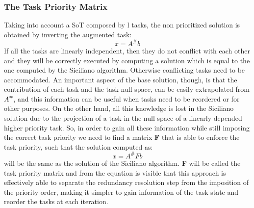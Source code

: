 \documentclass[11pt,a4paper, twocolumn, twoside]{article}
\begin{document}
\subsubsection{The Task Priority Matrix}

Taking into account a SoT composed by l tasks, the non prioritized solution is obtained by inverting the augmented task:
\[
\overline{x} = A^\#b\]
If all the tasks are linearly independent, then they do not conflict with each other and they will be correctly executed by computing a solution which is equal to the one computed by the Siciliano algorithm. Otherwise conflicting tasks need to be accommodated.
An important aspect of the base solution, though, is that the contribution of each task and the task null space, can be easily extrapolated from $A^\#$, and this information can be useful when tasks need to be reordered or for other purposes. On the other hand, all this knowledge is lost in the Siciliano solution due to the projection of a task in the null space of a linearly depended higher priority task. 
So, in order to gain all these information while still imposing the correct task priority we need to find a matrix \textbf{F} that is able to enforce the task priority, such that the solution computed as: \[x = A^\#Fb\]
will be the same as the solution of the Siciliano algorithm.
\textbf{F} will be called the task priority matrix and from the equation is visible that this approach is effectively able to separate the redundancy resolution step from the imposition of the priority order, making it simpler to gain information of the task state and reorder the tasks at each iteration.
\end{document}

